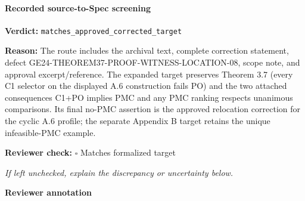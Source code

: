 \documentclass[10pt]{article}
\newcommand{\reviewerbox}{%
  \par\noindent\fbox{\parbox{0.96\linewidth}{\rule{0pt}{0.38in}}}\par
}
\newcommand{\reviewmatch}[1]{%
  \par\noindent\textbf{Reviewer check:} $\square$\; #1\par
  \noindent\emph{If left unchecked, explain the discrepancy or uncertainty below.}\par
}
\begin{document}
\paragraph{Recorded source-to-Spec screening}
\textbf{Verdict:} \texttt{matches\_approved\_corrected\_target}
\\
{\raggedright
\textbf{Reason:} The route includes the archival text, complete correction statement, defect GE24-\allowbreak{}THEOREM37-\allowbreak{}PROOF-\allowbreak{}WITNESS-\allowbreak{}LOCATION-\allowbreak{}08, scope note, and approval excerpt/\allowbreak{}reference.\allowbreak{}  The expanded target preserves Theorem 3.\allowbreak{}7 (every C1 selector on the displayed A.\allowbreak{}6 construction fails PO) and the two attached consequences C1+PO implies PMC and any PMC ranking respects unanimous comparisons.\allowbreak{}  Its final no-\allowbreak{}PMC assertion is the approved relocation correction for the cyclic A.\allowbreak{}6 profile;\allowbreak{} the separate Appendix B target retains the unique infeasible-\allowbreak{}PMC example.\allowbreak{}
\par}
\reviewmatch{Matches formalized target}
\noindent\textbf{Reviewer annotation}\par
\reviewerbox
\end{document}
